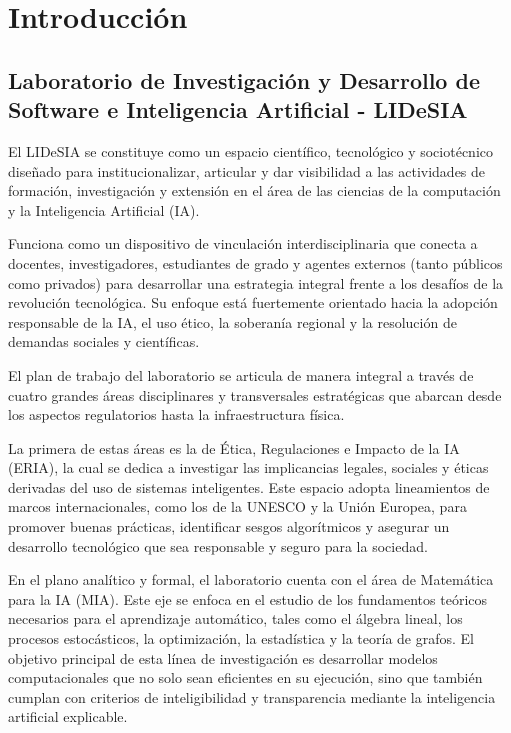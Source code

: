 \chapter{Introducción}\label{introducciuxf3n}

\section{Laboratorio de Investigación y Desarrollo de Software e Inteligencia Artificial - LIDeSIA}\label{laboratorio-de-investigaciuxf3n-y-desarrollo-de-software-e-inteligencia-artificial---lidesia}

El LIDeSIA se constituye como un espacio científico, tecnológico y sociotécnico diseñado para institucionalizar, articular y dar visibilidad a las actividades de formación, investigación y extensión en el área de las ciencias de la computación y la Inteligencia Artificial (IA).

Funciona como un dispositivo de vinculación interdisciplinaria que conecta a docentes, investigadores, estudiantes de grado y agentes externos (tanto públicos como privados) para desarrollar una estrategia integral frente a los desafíos de la revolución tecnológica. Su enfoque está fuertemente orientado hacia la adopción responsable de la IA, el uso ético, la soberanía regional y la resolución de demandas sociales y científicas.

El plan de trabajo del laboratorio se articula de manera integral a través de cuatro grandes áreas disciplinares y transversales estratégicas que abarcan desde los aspectos regulatorios hasta la infraestructura física.

La primera de estas áreas es la de Ética, Regulaciones e Impacto de la IA (ERIA), la cual se dedica a investigar las implicancias legales, sociales y éticas derivadas del uso de sistemas inteligentes. Este espacio adopta lineamientos de marcos internacionales, como los de la UNESCO y la Unión Europea, para promover buenas prácticas, identificar sesgos algorítmicos y asegurar un desarrollo tecnológico que sea responsable y seguro para la sociedad.

En el plano analítico y formal, el laboratorio cuenta con el área de Matemática para la IA (MIA). Este eje se enfoca en el estudio de los fundamentos teóricos necesarios para el aprendizaje automático, tales como el álgebra lineal, los procesos estocásticos, la optimización, la estadística y la teoría de grafos. El objetivo principal de esta línea de investigación es desarrollar modelos computacionales que no solo sean eficientes en su ejecución, sino que también cumplan con criterios de inteligibilidad y transparencia mediante la inteligencia artificial explicable.

